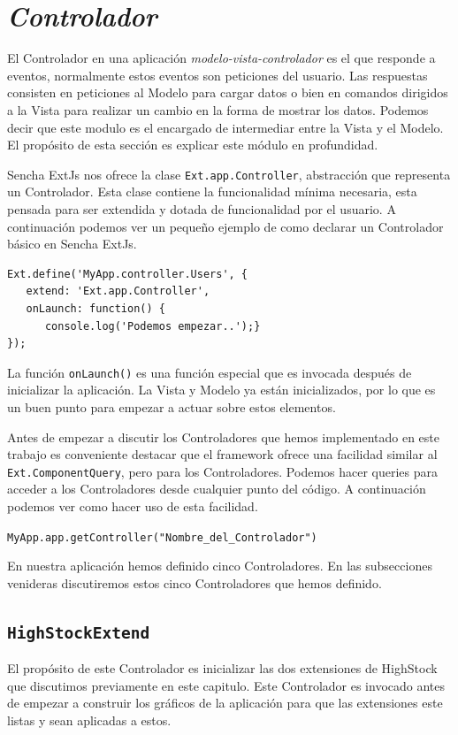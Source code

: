 \section{\emph{Controlador}}
	El Controlador en una aplicación \emph{modelo-vista-controlador}\cite{MVCWiki} es el que responde a eventos, normalmente estos eventos son
	peticiones del usuario. Las respuestas consisten en peticiones al Modelo para cargar datos o bien en comandos dirigidos a la Vista para
	realizar un cambio en la forma de mostrar los datos. Podemos decir que este modulo es el encargado de intermediar entre la Vista y el Modelo.
	El propósito de esta sección es explicar este módulo en profundidad.
	\par
	Sencha ExtJs nos ofrece la clase \texttt{Ext.app.Controller}, abstracción que representa un Controlador. Esta clase contiene la funcionalidad
	mínima necesaria, esta pensada para ser extendida y dotada de funcionalidad por el usuario. A continuación podemos ver un pequeño ejemplo de
	como declarar un Controlador básico en Sencha ExtJs.
	\begin{lstlisting}
Ext.define('MyApp.controller.Users', {
   extend: 'Ext.app.Controller',
   onLaunch: function() {
      console.log('Podemos empezar..');}
});
	\end{lstlisting}
	La función \texttt{onLaunch()} es una función especial que es invocada después de inicializar la aplicación. La Vista y Modelo ya están
	inicializados, por lo que es un buen punto para empezar a actuar sobre estos elementos.
	\par
	Antes de empezar a discutir los Controladores que hemos implementado en este trabajo es conveniente destacar que el framework ofrece una
	facilidad similar al \texttt{Ext.ComponentQuery}, pero para los Controladores. Podemos hacer queries para acceder a los Controladores desde
	cualquier punto del código. A continuación podemos ver como hacer uso de esta facilidad.
    		\begin{center} \texttt{MyApp.app.getController("Nombre\_del\_Controlador")}  \end{center}
	\par
	En nuestra aplicación hemos definido cinco Controladores. En las subsecciones venideras discutiremos estos cinco Controladores que hemos
	definido.
	\subsection{\texttt{HighStockExtend}}
		El propósito de este Controlador es inicializar las dos extensiones de HighStock que discutimos previamente en este capitulo. Este Controlador es
		invocado antes de empezar a construir los gráficos de la aplicación para que las extensiones este listas y sean aplicadas a estos.
